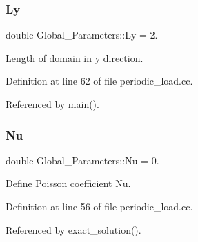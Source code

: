 \subsubsection{\texorpdfstring{Ly}{Ly}}
{\footnotesize\ttfamily double Global\+\_\+\+Parameters\+::\+Ly = 2.}



Length of domain in y direction. 



Definition at line 62 of file periodic\+\_\+load.\+cc.



Referenced by main().

\mbox{\label{namespaceGlobal__Parameters_a20fccdcfa2c15ad8b951b9ada3bb1661}} 
\subsubsection{\texorpdfstring{Nu}{Nu}}
{\footnotesize\ttfamily double Global\+\_\+\+Parameters\+::\+Nu = 0.}



Define Poisson coefficient Nu. 



Definition at line 56 of file periodic\+\_\+load.\+cc.



Referenced by exact\+\_\+solution().

